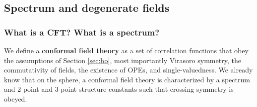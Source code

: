 \documentclass[12pt, a4paper]{article}
\theoremstyle{break}
\begin{document}
\subsection{Spectrum and degenerate fields}

\subsubsection{What is a CFT? What is a spectrum?}

We define a \textbf{conformal field theory} as a set of correlation functions that obey the assumptions of Section \ref{sec:bo}, most importantly Virasoro symmetry, the commutativity of fields, the existence of OPEs, and single-valuedness. We already know that on the sphere, a conformal field theory is characterized by a spectrum and 2-point and 3-point structure constants such that crossing symmetry is obeyed.
\end{document}
